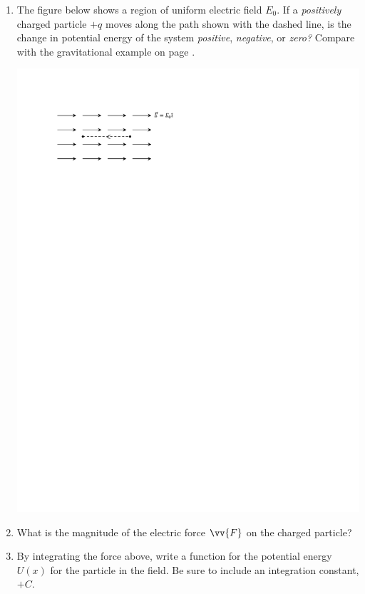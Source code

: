 \begin{enumerate}[labparts]

\item The figure below shows a region of uniform electric field $E_0$.  If a \textit{positively} charged particle $+q$ moves along the path shown with the dashed line, is the change in potential energy of the system \textit{positive}, \textit{negative}, or \textit{zero?}  Compare with the gravitational example on page \pageref{part_potential_intro_grav_work}.
\begin{center}
\includegraphics{potential_intro/activity_2_figs/uniform_E_field.pdf}
\end{center}


\item What is the magnitude of the electric force $\vv{F}$ on the charged particle?
\answerspace{0.3in}

\item By integrating the force above, write a function for the potential energy $U(x)$ for the particle in the field.  Be sure to include an integration constant, $+C$.
\answerspace{0.3in}


\end{enumerate}
